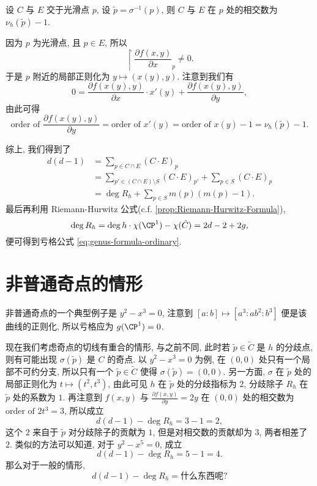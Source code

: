 \begin{claim}
设 $C$ 与 $E$ 交于光滑点 $p$, 设 $\tilde{p} = \sigma^{-1}(p)$,
则 $C$ 与 $E$ 在 $p$ 处的相交数为 $\nu_h(\tilde{p}) - 1$.
\end{claim}

因为 $p$ 为光滑点, 且 $p \in E$, 所以
\[\restriction{\frac{\partial f(x,y)}{\partial x}}_p \ne 0.\]
于是 $p$ 附近的局部正则化为 $y \mapsto (x(y),y)$.
注意到我们有
\[0 = \frac{\partial f(x(y),y)}{\partial x}\cdot x'(y) + \frac{\partial f(x(y),y)}{\partial y},\]
由此可得
\[\text{order of }\frac{\partial f(x(y),y)}{\partial y} = \text{order of }x'(y) = \text{order of }x(y) - 1 = \nu_h(\tilde{p}) - 1.\]

综上, 我们得到了
\begin{align*}
d(d-1) &= \sum_{p\in C\cap E}(C\cdot E)_p\\
&= \sum_{p' \in (C\cap E)\setminus S}(C\cdot E)_{p'} + \sum_{p \in S}(C\cdot E)_p\\
&= \deg R_h + \sum_{p \in S}m(p)(m(p) - 1).
\end{align*}
最后再利用 Riemann-Hurwitz 公式(c.f. \cref{prop:Riemann-Hurwitz-Formula}),
\[\deg R_h = \deg h\cdot \chi(\CP^1) - \chi(\tilde{C}) = 2d - 2 + 2g,\]
便可得到亏格公式 \cref{eq:genus-formula-ordinary}.

\section{非普通奇点的情形}

非普通奇点的一个典型例子是 $y^2 - x^3 = 0$,
注意到 $[a:b]\mapsto [a^3:ab^2:b^3]$ 便是该曲线的正则化,
所以亏格应为 $g(\CP^1) = 0$.

现在我们考虑奇点的切线有重合的情形, 与之前不同,
此时若 $\tilde{p} \in \tilde{C}$ 是 $h$ 的分歧点,
则有可能出现 $\sigma(\tilde{p})$ 是 $C$ 的奇点.
以 $y^2 - x^3 = 0$ 为例, 在 $(0,0)$ 处只有一个局部不可约分支,
所以只有一个 $\tilde{p} \in \tilde{C}$ 使得 $\sigma(\tilde{p}) = (0,0)$.
另一方面, $\sigma$ 在 $\tilde{p}$ 处的局部正则化为 $t \mapsto (t^2, t^3)$,
由此可见 $h$ 在 $\tilde{p}$ 处的分歧指标为 $2$,
分歧除子 $R_h$ 在 $\tilde{p}$ 处的系数为 $1$.
再注意到 $f(x,y)$ 与 $\frac{\partial f(x,y)}{\partial y} = 2y$ 在 $(0,0)$ 处的相交数为
$\text{order of }2t^3 = 3$, 所以成立
\[d(d-1) - \deg R_h = 3 - 1 = 2,\]
这个 $2$ 来自于 $\tilde{p}$ 对分歧除子的贡献为 $1$,
但是对相交数的贡献却为 $3$, 两者相差了 $2$.
类似的方法可以知道, 对于 $y^2 - x^5 = 0$, 成立
\[d(d-1) - \deg R_h = 5 - 1 = 4.\]
那么对于一般的情形,
\begin{equation}
\label{eq:genus-formula-what}
d(d-1) - \deg R_h = \text{什么东西呢?}
\end{equation}

